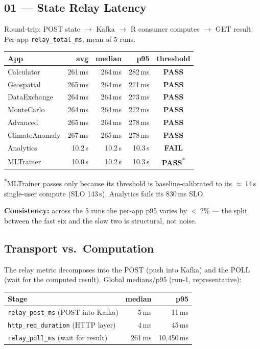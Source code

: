 \documentclass[11pt,a4paper]{article}
\newcommand{\pass}{\textcolor{pass}{\textbf{PASS}}}
\newcommand{\fail}{\textcolor{fail}{\textbf{FAIL}}}
\begin{document}
\subsection{01 — State Relay Latency}

Round-trip: POST state $\to$ Kafka $\to$ R consumer computes $\to$ GET result.
Per-app \texttt{relay\_total\_ms}, mean of 5 runs.

\begin{tabular}{@{}lrrrc@{}}
\toprule
\textbf{App} & \textbf{avg} & \textbf{median} & \textbf{p95} & \textbf{threshold} \\
\midrule
Calculator      & 261\,ms & 264\,ms & 282\,ms & \pass \\
Geospatial      & 265\,ms & 264\,ms & 271\,ms & \pass \\
DataExchange    & 264\,ms & 264\,ms & 273\,ms & \pass \\
MonteCarlo      & 264\,ms & 264\,ms & 272\,ms & \pass \\
Advanced        & 265\,ms & 264\,ms & 278\,ms & \pass \\
ClimateAnomaly  & 267\,ms & 265\,ms & 278\,ms & \pass \\
Analytics       & 10.2\,s & 10.2\,s & 10.3\,s & \fail \\
MLTrainer       & 10.0\,s & 10.2\,s & 10.3\,s & \pass\textsuperscript{*} \\
\bottomrule
\end{tabular}

\medskip
\noindent\footnotesize\textsuperscript{*}MLTrainer passes only because its
threshold is baseline-calibrated to its $\approx$\,14\,s single-user compute
(SLO 143\,s). Analytics fails its 830\,ms SLO. \normalsize

\medskip
\noindent\textbf{Consistency:} across the 5 runs the per-app p95 varies by
$<$\,2\% — the split between the fast six and the slow two is structural, not
noise.

\subsection{Transport vs.\ Computation}\label{sec:postpoll}

The relay metric decomposes into the POST (push into Kafka) and the POLL (wait
for the computed result). Global medians/p95 (run-1, representative):

\begin{tabular}{@{}lrr@{}}
\toprule
\textbf{Stage} & \textbf{median} & \textbf{p95} \\
\midrule
\texttt{relay\_post\_ms} (POST into Kafka) & 5\,ms   & 11\,ms   \\
\texttt{http\_req\_duration} (HTTP layer)  & 4\,ms   & 45\,ms   \\
\texttt{relay\_poll\_ms} (wait for result) & 261\,ms & 10{,}450\,ms \\
\bottomrule
\end{tabular}
\end{document}
